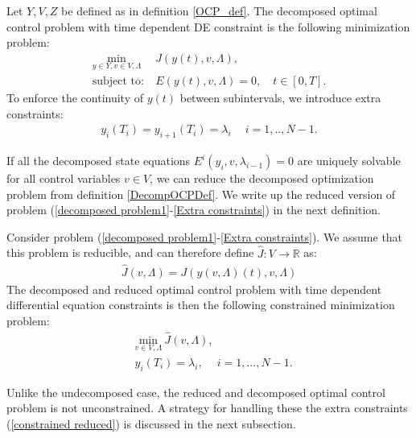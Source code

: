 \begin{definition} \label{DecompOCPDef}
Let $Y,V,Z$ be defined as in definition \ref{OCP_def}. The decomposed optimal control problem with time dependent DE constraint is the following minimization problem:
\begin{align}
\underset{y\in Y,v\in V,\Lambda}{\text{min}} \ &J(y(t),v,\Lambda),  \label{decomposed problem1}\\
\textrm{subject to:} \ &E(y(t),v,\Lambda)=0, \quad t\in [0,T]. \label{decomposed problem}
\end{align}
To enforce the continuity of $y(t)$ between subintervals, we introduce extra constraints:
 \begin{align}
y_{i}(T_i)=y_{i+1}(T_i)=\lambda_i \quad \ i=1,..,N-1. \label{Extra constraints}
\end{align}
\end{definition}
\noindent
If all the decomposed state equations $E^i(y_i,v,\lambda_{i-1})=0$ are uniquely solvable for all control variables $v\in V$, we can reduce the decomposed optimization problem from definition \ref{DecompOCPDef}. We write up the reduced version of problem (\ref{decomposed problem1}-\ref{Extra constraints}) in the next definition.
\begin{definition} \label{DecompRedOCPDef}
Consider problem (\ref{decomposed problem1}-\ref{Extra constraints}). We assume that this problem is reducible, and can therefore define $\hat J:V\rightarrow\mathbb{R}$ as:
\begin{align*}
\hat J(v,\Lambda) = J(y(v,\Lambda)(t),v,\Lambda)
\end{align*}
The decomposed and reduced optimal control problem with time dependent differential equation constraints is then the following constrained minimization problem:
\begin{align}
&\underset{v\in V,\Lambda}{\text{min}} \ \hat J(v,\Lambda), \label{constrained reduced j}\\
&y_{i}(T_i)=\lambda_i, \ \quad  i=1,...,N-1. \label{constrained reduced}
\end{align}
\end{definition}
\noindent
Unlike the undecomposed case, the reduced and decomposed optimal control problem is not unconstrained. A strategy for handling these the extra constraints (\ref{constrained reduced}) is discussed in the next subsection.
